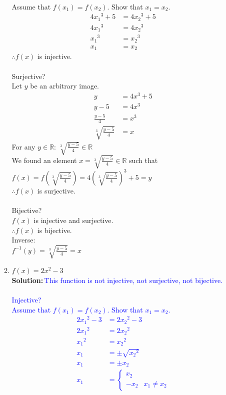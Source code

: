 \documentclass{article}
\newcommand{\sol}[1]{\textbf{Solution:\,}\textcolor{blue}{#1}}
\begin{document}
\begin{enumerate}
\begin{enumerate}
{\\Assume that $f(x_1)=f(x_2)$. Show that $x_1=x_2$.
\begin{align*}
4{x_1}^3 + 5&=4{x_2}^3 + 5&\text{}\\
4{x_1}^3&=4{x_2}^3&\text{}\\
{x_1}^3&={x_2}^3&\text{}\\
x_1&=x_2&\text{}
\end{align*}
$\therefore f(x)$ is injective.
\\\\Surjective?
\\Let $y$ be an arbitrary image.
\begin{align*}
y&=4x^3 + 5&\text{}\\
y-5&=4x^3&\text{}\\
\frac{y-5}{4}&=x^3&\text{}\\
\sqrt[3]{\frac{y-5}{4}}&=x&\text{}
\end{align*}
For any $y\in\mathbb{R}$: $\sqrt[3]{\frac{y-5}{4}}\in\mathbb{R}$
\\We found an element $x=\sqrt[3]{\frac{y-5}{4}}\in\mathbb{R}$ such that $f(x)=f(\sqrt[3]{\frac{y-5}{4}})=4(\sqrt[3]{\frac{y-5}{4}})^3 + 5=y$
\\$\therefore f(x)$ is surjective.
\\\\Bijective?
\\$f(x)$ is injective and surjective.
\\$\therefore f(x)$ is bijective.
\\Inverse:
\\$f^{-1}(y)=\sqrt[3]{\frac{y-5}{4}}=x$
}\\
\item $f(x) = 2x^2-3$
\\\sol{This function is not injective, not surjective, not bijective.
\\\\Injective?
\\Assume that $f(x_1)=f(x_2)$. Show that $x_1=x_2$.
\begin{align*}
2{x_1}^2-3&=2{x_2}^2-3&\text{}\\
2{x_1}^2&=2{x_2}^2&\text{}\\
{x_1}^2&={x_2}^2&\text{}\\
{x_1}&=\pm\sqrt{{x_2}^2}&\text{}\\
{x_1}&=\pm x_2&\text{}\\
x_1&=\begin{cases}x_2&\text{}\\-x_2&\text{$x_1\neq x_2$}\end{cases}

\end{align*}}
\end{enumerate}
\end{enumerate}
\end{document}
